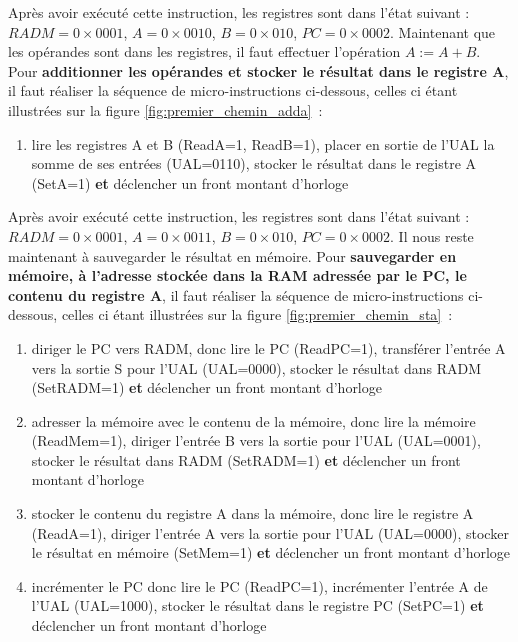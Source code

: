 Après avoir exécuté cette instruction, les registres sont dans l'état suivant : $RADM=0\times0001$, $A=0\times0010$, $B=0\times010$, $PC=0\times0002$. Maintenant que les opérandes sont dans les registres, il faut effectuer l'opération $A:=A+B$. Pour \textbf{additionner les opérandes et stocker le résultat dans le registre A}, il faut réaliser la séquence de micro-instructions ci-dessous, celles ci étant illustrées sur la figure \ref{fig:premier_chemin_adda}~:
\begin{enumerate}
\item lire les registres A et B (ReadA=1, ReadB=1), placer en sortie de l'UAL la somme de ses entrées (UAL=0110), stocker le résultat dans le registre A (SetA=1) \textbf{et} déclencher un front montant d'horloge
\end{enumerate}


Après avoir exécuté cette instruction, les registres sont dans l'état suivant : $RADM=0\times0001$, $A=0\times0011$, $B=0\times010$, $PC=0\times0002$. Il nous reste maintenant à sauvegarder le résultat en mémoire. Pour \textbf{sauvegarder en mémoire, à l'adresse stockée dans la RAM adressée par le PC, le contenu du registre A}, il faut réaliser la séquence de micro-instructions ci-dessous, celles ci étant illustrées sur la figure \ref{fig:premier_chemin_sta}~:
\begin{enumerate}
\item diriger le PC vers RADM, donc lire le PC (ReadPC=1), transférer l'entrée A vers la sortie S pour l'UAL (UAL=0000), stocker le résultat dans RADM (SetRADM=1) \textbf{et} déclencher un front montant d'horloge
\item adresser la mémoire avec le contenu de la mémoire, donc lire la mémoire (ReadMem=1), diriger l'entrée B vers la sortie pour l'UAL (UAL=0001), stocker le résultat dans RADM (SetRADM=1) \textbf{et} déclencher un front montant d'horloge
\item stocker le contenu du registre A dans la mémoire, donc lire le registre A (ReadA=1), diriger l'entrée A vers la sortie pour l'UAL (UAL=0000), stocker le résultat en mémoire (SetMem=1) \textbf{et} déclencher un front montant d'horloge
\item incrémenter le PC donc lire le PC (ReadPC=1), incrémenter l'entrée A de l'UAL (UAL=1000), stocker le résultat dans le registre PC (SetPC=1) \textbf{et} déclencher un front montant d'horloge
\end{enumerate}


